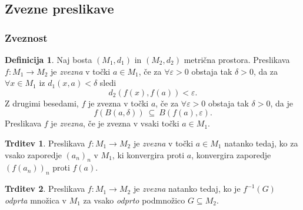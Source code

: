 \documentclass[11pt]{article}
\theoremstyle{definition}
\newtheorem{definicija}{Definicija}[section]
\theoremstyle{definition}
\newtheorem{trditev}{Trditev}[section]
\theoremstyle{definition}
\begin{document}

\subsection{Zvezne preslikave}
\vspace{0.5cm}


\subsubsection{Zveznost}
\vspace{0.5cm}

\begin{definicija}

Naj bosta $(M_1, d_1)$ in $(M_2, d_2)$ metrična prostora. Preslikava $f: M_1 \rightarrow M_2$ je \textit{zvezna} v točki $a \in M_1$, če za $\forall \varepsilon > 0$ obstaja tak $\delta > 0$, da za $\forall x  \in M_1$ iz $d_1(x, a) < \delta$ sledi
$$d_2(f(x), f(a)) < \varepsilon.$$
Z drugimi besedami, $f$ je zvezna v točki $a$, če za $\forall \varepsilon > 0$ obstaja tak $\delta > 0$, da je
$$f(B(a, \delta)) ~\subseteq~ B(f(a), \varepsilon).$$
Preslikava $f$ je \textit{zvezna}, če je zvezna v vsaki točki $a \in M_1$.

\end{definicija}
\vspace{0.5cm}

\begin{trditev}

Preslikava $f: M_1 \rightarrow M_2$ je \textit{zvezna} v točki $a \in M_1$ natanko tedaj, ko za vsako zaporedje $(a_n)_n$ v $M_1$, ki konvergira proti $a$, konvergira zaporedje $(f(a_n))_n$ proti $f(a)$.

\end{trditev}
\vspace{0.5cm}

\begin{trditev}

Preslikava $f: M_1 \rightarrow M_2$ je \textit{zvezna} natanko tedaj, ko je $f^{-1}(G)$ \textit{odprta} množica v $M_1$ za vsako \textit{odprto} podmnožico $G \subseteq M_2$.

\end{trditev}
\vspace{0.5cm}
\end{document}

